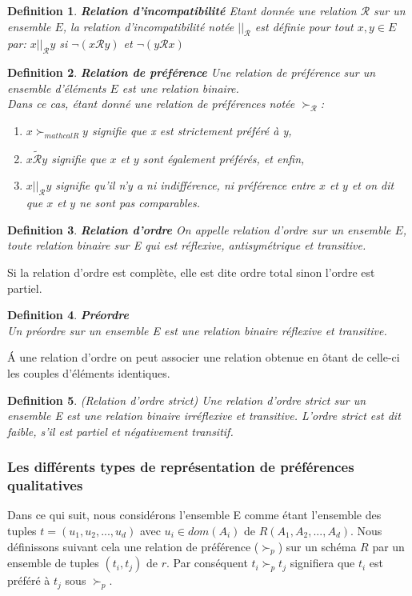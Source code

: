 \documentclass[a4paper,12pt,openany,oneside]{article}
\newtheorem{defn}{Definition} %
\begin{document}
\begin{defn}\textbf{Relation d'incompatibilité}
	Etant donnée une relation $\mathcal{R}$ sur un ensemble $E$, la relation d'incompatibilité notée $||_{\mathcal{R}}$ est définie pour tout $x,y\in E$ par: $x||_{\mathcal{R}}y$ si $\neg(x\mathcal{R}y)$ et $\neg (y\mathcal{R}x)$ 
\end{defn}

\begin{defn}\textbf{Relation de préférence}
	Une relation de préférence sur un ensemble d'éléments $E$ est une relation binaire.\\
	Dans ce cas, étant donné une relation de préférences notée $\succ_{\mathcal{R}}$:
	\begin{enumerate}
		\item $x\succ_{mathcal{R}} y$ signifie que x est strictement préféré à y,
		\item $x\tilde{\mathcal{R}}y$ signifie que $x$ et $y$ sont également préférés, et enfin,
		\item $x||_{\mathcal{R}}y$ signifie qu'il n'y a ni indifférence, ni préférence entre $x$ et $y$ et on dit que $x$ et $y$ ne sont pas comparables.
	\end{enumerate}
\end{defn}

\begin{defn}\textbf{Relation d'ordre}
	On appelle relation d'ordre sur un ensemble $E$, toute relation binaire sur E qui est réflexive, antisymétrique et transitive. 
\end{defn}

Si la relation d’ordre est complète, elle est dite ordre total sinon l’ordre est partiel.
\begin{defn}\textbf{Préordre}\\
Un préordre sur un ensemble E est une relation binaire réflexive et transitive.
\end{defn}

Á une relation d’ordre on peut associer une relation obtenue en ôtant de celle-ci les couples d’éléments identiques.

\begin{defn}(Relation d’ordre strict)
 Une relation d’ordre strict sur un ensemble E est une relation binaire irréflexive et transitive. L’ordre strict est dit faible, s’il est partiel et négativement transitif.	
\end{defn}

\subsubsection{Les différents types de représentation de préférences qualitatives}
Dans ce qui suit, nous considérons l'ensemble E comme étant l'ensemble des tuples $t=(u_1,u_2,...,u_d)$ avec $u_i \in dom(A_i)$ de $R(A_1,A_2,...,A_d)$. 
Nous définissons suivant cela une relation de préférence ($\succ_p$) sur un schéma $R$ par un ensemble de tuples $(t_i, t_j)$ de $r$. Par conséquent $t_i\succ_p t_j$ signifiera que $t_i$ est préféré à $t_j$ sous $\succ_p$.\\
\end{document}

